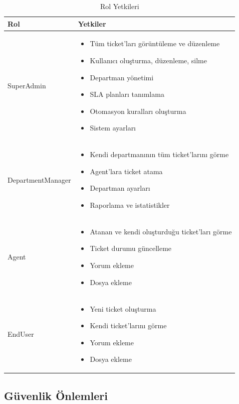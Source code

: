 \documentclass[12pt,a4paper]{article}
\begin{document}
\begin{table}[h]
\centering
\begin{tabular}{|l|p{8cm}|}
\hline
\textbf{Rol} & \textbf{Yetkiler} \\
\hline
SuperAdmin & 
\begin{itemize}[nosep,leftmargin=*]
    \item Tüm ticket'ları görüntüleme ve düzenleme
    \item Kullanıcı oluşturma, düzenleme, silme
    \item Departman yönetimi
    \item SLA planları tanımlama
    \item Otomasyon kuralları oluşturma
    \item Sistem ayarları
\end{itemize} \\
\hline
DepartmentManager & 
\begin{itemize}[nosep,leftmargin=*]
    \item Kendi departmanının tüm ticket'larını görme
    \item Agent'lara ticket atama
    \item Departman ayarları
    \item Raporlama ve istatistikler
\end{itemize} \\
\hline
Agent & 
\begin{itemize}[nosep,leftmargin=*]
    \item Atanan ve kendi oluşturduğu ticket'ları görme
    \item Ticket durumu güncelleme
    \item Yorum ekleme
    \item Dosya ekleme
\end{itemize} \\
\hline
EndUser & 
\begin{itemize}[nosep,leftmargin=*]
    \item Yeni ticket oluşturma
    \item Kendi ticket'larını görme
    \item Yorum ekleme
    \item Dosya ekleme
\end{itemize} \\
\hline
\end{tabular}
\caption{Rol Yetkileri}
\end{table}

\subsection{Güvenlik Önlemleri}
\end{document}
